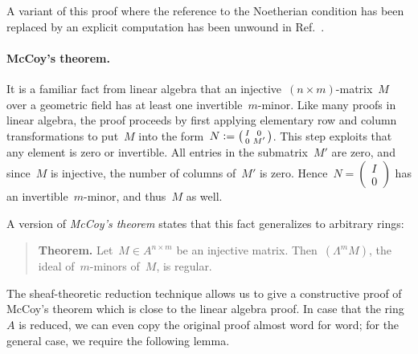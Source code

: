 \documentclass{ws-rv9x6}
\newcommand{\defeq}{\vcentcolon=}
\renewcommand{\_}{\mathpunct{.}}
\newcommand{\?}{\,{:}\,}
\begin{document}
A variant of this proof where the reference to the Noetherian condition has
been replaced by an explicit computation has been unwound in
Ref.~\cite{blechschmidt:generic-freeness}.


\paragraph{McCoy's theorem.}\label{par:mccoy}
It is a familiar fact from linear algebra that an injective~$(n \times
m)$-matrix~$M$ over a geometric field has at least one invertible~$m$-minor.
Like many proofs in linear algebra, the proof proceeds by first applying
elementary row and column transformations to put~$M$ into the form~$N \defeq
\left(\begin{smallmatrix}I&0\\0&M'\end{smallmatrix}\right)$. This step exploits
that any element is zero or invertible. All entries in the submatrix~$M'$ are
zero, and since~$M$ is injective, the number of columns of~$M'$ is zero.
Hence~$N = \left(\begin{smallmatrix}I\\0\end{smallmatrix}\right)$ has an
invertible~$m$-minor, and thus~$M$ as well.

A version of \emph{McCoy's theorem} states that this fact
generalizes to arbitrary rings:

\begin{quote}
\textbf{Theorem.} Let~$M \in A^{n \times m}$ be an injective matrix.
Then~$(\Lambda^m M)$, the ideal of~$m$-minors of~$M$, is regular.
\end{quote}

The sheaf-theoretic reduction technique allows us to give a constructive proof
of McCoy's theorem which is close to the linear algebra proof. In case that the
ring~$A$ is reduced, we can even copy the original proof almost word for word;
for the general case, we require the following lemma.
\end{document}
